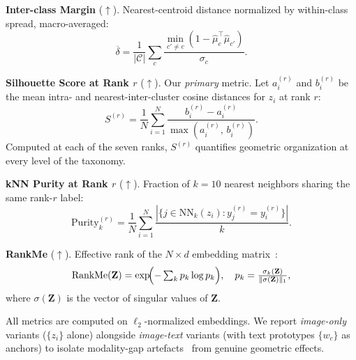 \noindent\textbf{Inter-class Margin} ($\uparrow$).
Nearest-centroid distance normalized by within-class spread, macro-averaged:
\begin{equation}
\overline{\delta}
= \frac{1}{|\mathcal{C}|}
  \sum_{c}
  \frac{\min_{c'\neq c}(1 - \hat{\mu}_c^{\top}\hat{\mu}_{c'})}
       {\sigma_c}.
\label{eq:inter_margin}
\end{equation}

\noindent\textbf{Silhouette Score at Rank $r$} ($\uparrow$).
Our \emph{primary} metric. Let $a_i^{(r)}$ and $b_i^{(r)}$ be the mean intra- and
nearest-inter-cluster cosine distances for $z_i$ at rank $r$:
\begin{equation}
S^{(r)}
= \frac{1}{N}
  \sum_{i=1}^{N}
  \frac{b_i^{(r)} - a_i^{(r)}}
       {\max(a_i^{(r)},\, b_i^{(r)})}.
\label{eq:silhouette}
\end{equation}
Computed at each of the seven ranks, $S^{(r)}$ quantifies geometric organization at
every level of the taxonomy.

\noindent\textbf{kNN Purity at Rank $r$} ($\uparrow$).
Fraction of $k{=}10$ nearest neighbors sharing the same rank-$r$ label:
\begin{equation}
\mathrm{Purity}^{(r)}_k
= \frac{1}{N}
  \sum_{i=1}^{N}
  \frac{|\{j \in \mathrm{NN}_k(z_i) : y_j^{(r)} = y_i^{(r)}\}|}{k}.
\label{eq:knn_purity}
\end{equation}

\noindent\textbf{RankMe} ($\uparrow$).
Effective rank of the $N{\times}d$ embedding matrix~\cite{garrido2023rankme}:
\begin{equation}
\mathrm{RankMe}(\mathbf{Z})
= \exp\!\Bigl(-\textstyle\sum_{k} p_k \log p_k\Bigr),
\quad
p_k = \frac{\sigma_k(\mathbf{Z})}{\|\sigma(\mathbf{Z})\|_1},
\label{eq:rankme}
\end{equation}
where $\sigma(\mathbf{Z})$ is the vector of singular values of $\mathbf{Z}$.

All metrics are computed on $\ell_2$-normalized embeddings. We report
\emph{image-only} variants ($\{z_i\}$ alone) alongside \emph{image-text} variants
(with text prototypes $\{w_c\}$ as anchors) to isolate modality-gap
artefacts~\cite{liang2022mindgap} from genuine geometric effects.

